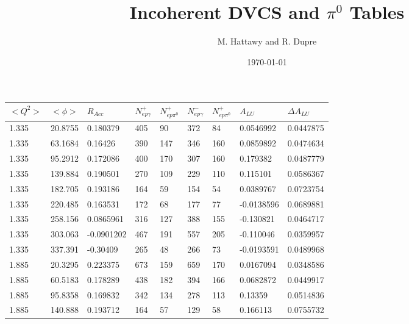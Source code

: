 \documentclass[12pt]{article}
\begin{document}
\title{Incoherent DVCS and $\pi^{0}$ Tables}


\author{M. Hattawy and R. Dupre \\[0.1ex]}


\date \today
%
\maketitle


\begin{table}[!h]
   \begin{center}
      \begin{tabular}{||l|l|l|l|l|l|l|l|l||}
         \hline
 
$<Q^{2}>$ & $<\phi>$ &$R_{Acc}$    &$N^{+}_{ep\gamma}$    &$N^{+}_{ep\pi^{0}}$   &$N^{-}_{ep\gamma}$   &$N^{+}_{ep\pi^{0}}$    &$A_{LU}$    &$\Delta A_{LU}$\\
\hline
\hline
1.335    &20.8755    &0.180379    &405    &90   &372   &84    &0.0546992    &0.0447875\\
1.335    &63.1684    &0.16426    &390    &147   &346   &160    &0.0859892    &0.0474634\\
1.335    &95.2912    &0.172086    &400    &170   &307   &160    &0.179382    &0.0487779\\
1.335    &139.884    &0.190501    &270    &109   &229   &110    &0.115101    &0.0586367\\
1.335    &182.705    &0.193186    &164    &59   &154   &54    &0.0389767    &0.0723754\\
1.335    &220.485    &0.163531    &172    &68   &177   &77    &-0.0138596    &0.0689881\\
1.335    &258.156    &0.0865961    &316    &127   &388   &155    &-0.130821    &0.0464717\\
1.335    &303.063    &-0.0901202    &467    &191   &557   &205    &-0.110046    &0.0359957\\
1.335    &337.391    &-0.30409    &265    &48   &266   &73    &-0.0193591    &0.0489968\\
1.885    &20.3295    &0.223375    &673    &159   &659   &170    &0.0167094    &0.0348586\\
\hline
1.885    &60.5183    &0.178289    &438    &182   &394   &166    &0.0682872    &0.0449917\\
1.885    &95.8358    &0.169832    &342    &134   &278   &113    &0.13359    &0.0514836\\
1.885    &140.888    &0.193712    &164    &57   &129   &58    &0.166113    &0.0755732\\

\end{tabular}
\end{center}
\end{table}
\end{document}
